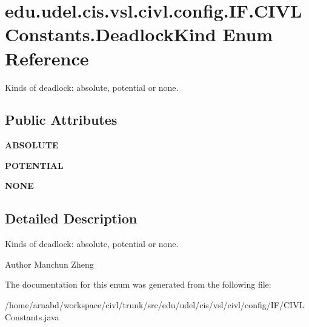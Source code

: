 \hypertarget{enumedu_1_1udel_1_1cis_1_1vsl_1_1civl_1_1config_1_1IF_1_1CIVLConstants_1_1DeadlockKind}{}\section{edu.\+udel.\+cis.\+vsl.\+civl.\+config.\+I\+F.\+C\+I\+V\+L\+Constants.\+Deadlock\+Kind Enum Reference}
\label{enumedu_1_1udel_1_1cis_1_1vsl_1_1civl_1_1config_1_1IF_1_1CIVLConstants_1_1DeadlockKind}


Kinds of deadlock\+: absolute, potential or none.  


\subsection*{Public Attributes}
\begin{DoxyCompactItemize}
\item 
\hypertarget{enumedu_1_1udel_1_1cis_1_1vsl_1_1civl_1_1config_1_1IF_1_1CIVLConstants_1_1DeadlockKind_aebb573932e4c10236bf85ad67e988ea6}{}{\bfseries A\+B\+S\+O\+L\+U\+T\+E}\label{enumedu_1_1udel_1_1cis_1_1vsl_1_1civl_1_1config_1_1IF_1_1CIVLConstants_1_1DeadlockKind_aebb573932e4c10236bf85ad67e988ea6}

\item 
\hypertarget{enumedu_1_1udel_1_1cis_1_1vsl_1_1civl_1_1config_1_1IF_1_1CIVLConstants_1_1DeadlockKind_a712afb381e8431336724f9b474ffb586}{}{\bfseries P\+O\+T\+E\+N\+T\+I\+A\+L}\label{enumedu_1_1udel_1_1cis_1_1vsl_1_1civl_1_1config_1_1IF_1_1CIVLConstants_1_1DeadlockKind_a712afb381e8431336724f9b474ffb586}

\item 
\hypertarget{enumedu_1_1udel_1_1cis_1_1vsl_1_1civl_1_1config_1_1IF_1_1CIVLConstants_1_1DeadlockKind_a6451f08439b2182605a9cb0e2f40a902}{}{\bfseries N\+O\+N\+E}\label{enumedu_1_1udel_1_1cis_1_1vsl_1_1civl_1_1config_1_1IF_1_1CIVLConstants_1_1DeadlockKind_a6451f08439b2182605a9cb0e2f40a902}

\end{DoxyCompactItemize}


\subsection{Detailed Description}
Kinds of deadlock\+: absolute, potential or none. 

\begin{DoxyAuthor}{Author}
Manchun Zheng 
\end{DoxyAuthor}


The documentation for this enum was generated from the following file\+:\begin{DoxyCompactItemize}
\item 
/home/arnabd/workspace/civl/trunk/src/edu/udel/cis/vsl/civl/config/\+I\+F/C\+I\+V\+L\+Constants.\+java\end{DoxyCompactItemize}
